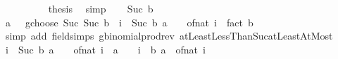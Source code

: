 \begin{isabellebody}
\ \ \isamarkupfalse%
\ {}\isanewline
\ \ \isamarkupfalse%
\ \isamarkupfalse%
\ {\isacharquery}{\kern0pt}thesis\ \isamarkupfalse%
\ simp\isanewline
{}\isamarkupfalse%
\isanewline
\ \ \isamarkupfalse%
\ {\isacharparenleft}{\kern0pt}Suc\ b{\isacharparenright}{\kern0pt}\isanewline
\ \ \isamarkupfalse%
\ \isamarkupfalse%
\ {\isachardoublequoteopen}{\isacharparenleft}{\kern0pt}{\isacharparenleft}{\kern0pt}a\ {\isacharplus}{\kern0pt}\ {}{\isacharparenright}{\kern0pt}\ gchoose\ {\isacharparenleft}{\kern0pt}Suc\ {\isacharparenleft}{\kern0pt}Suc\ b{\isacharparenright}{\kern0pt}{\isacharparenright}{\kern0pt}{\isacharparenright}{\kern0pt}\ {\isacharequal}{\kern0pt}\ {\isacharparenleft}{\kern0pt}{\isasymProd}i\ {\isacharequal}{\kern0pt}\ {}{\isachardot}{\kern0pt}{\isachardot}{\kern0pt}Suc\ b{\isachardot}{\kern0pt}\ a\ {\isacharplus}{\kern0pt}\ {\isacharparenleft}{\kern0pt}{}\ {\isacharminus}{\kern0pt}\ of{\isacharunderscore}{\kern0pt}nat\ i{\isacharparenright}{\kern0pt}{\isacharparenright}{\kern0pt}\ {\isacharslash}{\kern0pt}\ fact\ {\isacharparenleft}{\kern0pt}b\ {\isacharplus}{\kern0pt}\ {}{\isacharparenright}{\kern0pt}{\isachardoublequoteclose}\isanewline
\ \ \ \ \isamarkupfalse%
\ {\isacharparenleft}{\kern0pt}simp\ add{\isacharcolon}{\kern0pt}\ field{\isacharunderscore}{\kern0pt}simps\ gbinomial{\isacharunderscore}{\kern0pt}prod{\isacharunderscore}{\kern0pt}rev\ atLeastLessThanSuc{\isacharunderscore}{\kern0pt}atLeastAtMost{\isacharparenright}{\kern0pt}\isanewline
\ \ \isamarkupfalse%
\ \isamarkupfalse%
\ {\isachardoublequoteopen}{\isacharparenleft}{\kern0pt}{\isasymProd}i\ {\isacharequal}{\kern0pt}\ {}{\isachardot}{\kern0pt}{\isachardot}{\kern0pt}Suc\ b{\isachardot}{\kern0pt}\ a\ {\isacharplus}{\kern0pt}\ {\isacharparenleft}{\kern0pt}{}\ {\isacharminus}{\kern0pt}\ of{\isacharunderscore}{\kern0pt}nat\ i{\isacharparenright}{\kern0pt}{\isacharparenright}{\kern0pt}\ {\isacharequal}{\kern0pt}\ {\isacharparenleft}{\kern0pt}a\ {\isacharplus}{\kern0pt}\ {}{\isacharparenright}{\kern0pt}\ {\isacharasterisk}{\kern0pt}\ {\isacharparenleft}{\kern0pt}{\isasymProd}i\ {\isacharequal}{\kern0pt}\ {}{\isachardot}{\kern0pt}{\isachardot}{\kern0pt}b{\isachardot}{\kern0pt}\ a\ {\isacharminus}{\kern0pt}\ of{\isacharunderscore}{\kern0pt}nat\ i{\isacharparenright}{\kern0pt}{\isachardoublequoteclose}\isanewline

\end{isabellebody}
